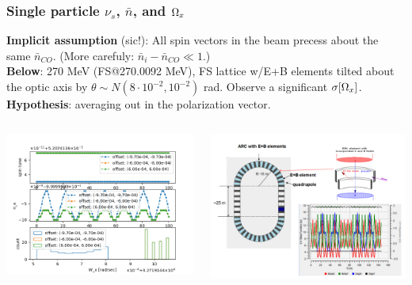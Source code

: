 \documentclass{beamer}
\begin{document}
\begin{frame}
  \frametitle{Single particle $\nu_s$, $\bar n$, and $\Omega_x$}
  \textbf{Implicit assumption} (sic!): All spin vectors in the beam precess about the same $\bar n_{CO}$. (More carefuly: $\bar n_i - \bar n_{CO} \ll 1$.)\\
  \textbf{Below}: 270 MeV (FS@270.0092 MeV), FS lattice w/E+B elements tilted about the optic axis by $\theta\sim N(8\cdot10^{-2}, 10^{-2})$ rad. Observe a significant $\sigma[\Omega_x]$.\\
  \textbf{Hypothesis}: averaging out in the polarization vector.
  \vspace*{-.5cm}
  \begin{columns}
    \begin{column}{.5\textwidth}
      \begin{center}
        \includegraphics[height=.5\paperheight]{img/spin_axis_motion/presentation/spin_tune_three}
      \end{center}
    \end{column}
    \begin{column}{.5\textwidth}
      \begin{center}
        \includegraphics[height=.5\paperheight]{img/spin_axis_motion/presentation/lattice}
      \end{center}
    \end{column}
  \end{columns}
\end{frame}
\end{document}
